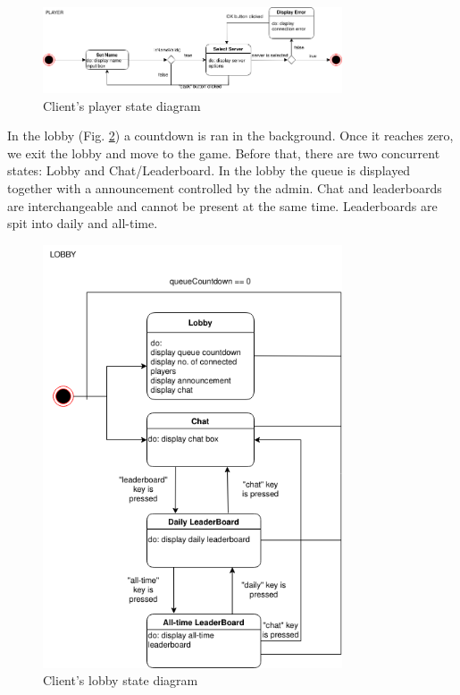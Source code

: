 \documentclass[titlepage]{article}
\newcommand{\figref}[1]{{(Fig. \hypersetup{linkcolor=blue}\ref{#1})}}
\begin{document}
\begin{figure}[H]
	\centering
	\includegraphics[width=0.79\textwidth]{state_diagram_player.png}
	\caption{Client's player state diagram}
	\label{fig:state-client-player}
\end{figure}

In the lobby \figref{fig:state-client-lobby} a countdown is ran in the background. Once it reaches zero, we exit the lobby and move to the game. Before that, there are two concurrent states: Lobby and Chat/Leaderboard. In the lobby the queue is displayed together with a announcement controlled by the admin. Chat and leaderboards are interchangeable and cannot be present at the same time. Leaderboards are spit into daily and all-time.

\begin{figure}[H]
	\centering
	\includegraphics[width=0.79\textwidth]{state_diagram_lobby.png}
	\caption{Client's lobby state diagram}
	\label{fig:state-client-lobby}
\end{figure}
\end{document}

